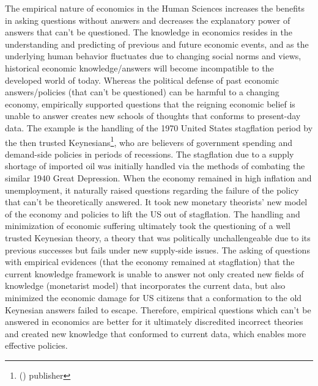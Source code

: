 \documentclass[a4paper,12pt]{article}
\newcommand{\citefoot}[1]{\footnote{\citeall{#1}}}
\newcommand{\citeall}[1]{\citeauth{#1} \citetitle{#1} (\citeyear{#1}) publisher \citelist{#1}{publisher}}
\begin{document}
The empirical nature of economics in the Human Sciences increases the benefits in asking questions without answers and decreases the explanatory power of answers that can’t be questioned. The knowledge in economics resides in the understanding and predicting of previous and future economic events, and as the underlying human behavior fluctuates due to changing social norms and views, historical economic knowledge/answers will become incompatible to the developed world of today. Whereas the political defense of past economic answers/policies (that can't be questioned) can be harmful to a changing economy, empirically supported questions that the reigning economic belief is unable to answer creates new schools of thoughts that conforms to present-day data. The example is the handling of the 1970 United States stagflation period by the then trusted Keynesians\citefoot{nielsen_2022}, who are believers of government spending and demand-side policies in periods of recessions. The stagflation due to a supply shortage of imported oil was initially handled via the methods of combating the similar 1940 Great Depression. When the economy remained in high inflation and unemployment, it naturally raised questions regarding the failure of the policy that can’t be theoretically answered. It took new monetary theorists’ new model of the economy and policies to lift the US out of stagflation. The handling and minimization of economic suffering ultimately took the questioning of a well trusted Keynesian theory, a theory that was politically unchallengeable due to its previous successes but fails under new supply-side issues. The asking of questions with empirical evidences (that the economy remained at stagflation) that the current knowledge framework is unable to answer not only created new fields of knowledge (monetarist model) that incorporates the current data, but also minimized the economic damage for US citizens that a conformation to the old Keynesian answers failed to escape. Therefore, empirical questions which can't be answered in economics are better for it ultimately discredited incorrect theories and created new knowledge that conformed to current data, which enables more effective policies.

\end{document}
